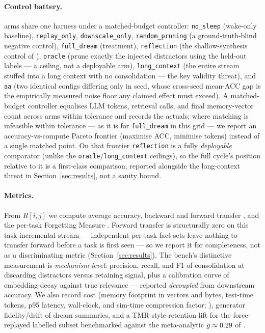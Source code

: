 \paragraph{Control battery.} \SWnArms{} arms share one harness under a
matched-budget controller: \texttt{no\_sleep} (wake-only baseline), \texttt{replay\_only},
\texttt{downscale\_only}, \texttt{random\_pruning} (a ground-truth-blind negative
control), \texttt{full\_dream} (treatment), \texttt{reflection} (the
shallow-synthesis control of \citealp{park2023generativeagents}), \texttt{oracle}
(prune exactly the injected distractors using the held-out labels --- a ceiling,
not a deployable arm), \texttt{long\_context} (the entire stream stuffed into a
long context with no consolidation --- the key validity threat), and \texttt{aa}
(two identical configs differing only in seed, whose cross-seed mean-ACC gap is
the empirically measured noise floor any claimed effect must exceed). A
matched-budget controller equalises LLM tokens, retrieval calls, and final
memory-vector count across arms within tolerance and records the actuals; where
matching is infeasible within tolerance --- as it is for \texttt{full\_dream} in
this grid --- we report an accuracy-vs-compute Pareto frontier (maximise ACC,
minimise tokens) instead of a single matched point. On that frontier
\texttt{reflection} is a fully \emph{deployable} comparator (unlike the
\texttt{oracle}/\texttt{long\_context} ceilings), so the full cycle's position
relative to it is a first-class comparison, reported alongside the long-context
threat in Section~\ref{sec:results}, not a sanity bound.

\paragraph{Metrics.} From $R[i,j]$ we compute average accuracy, backward and
forward transfer \citep{lopezpaz2017gem}, and the per-task Forgetting Measure
\citep{chaudhry2018riemannian}. Forward transfer is structurally zero on this
task-incremental stream --- independent per-task fact sets leave nothing to
transfer forward before a task is first seen --- so we report it for completeness,
not as a discriminating metric (Section~\ref{sec:results}). The bench's
distinctive measurement is
\emph{mechanism-level}: precision, recall, and F1 of consolidation at discarding
distractors versus retaining signal, plus a calibration curve of embedding-decay
against true relevance --- reported \emph{decoupled} from downstream accuracy.
We also record cost (memory footprint in vectors and bytes, test-time tokens,
p95 latency, wall-clock, and sim-time compression factor;
\citealp{diazrodriguez2018metrics}), generator fidelity/drift of dream
summaries, and a TMR-style retention lift for the force-replayed labelled subset
benchmarked against the meta-analytic $g\approx0.29$ of
\citet{hu2020tmr}.

